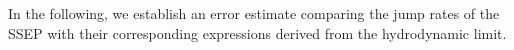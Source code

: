 \documentclass[UTF-8,reqno]{amsart}
\numberwithin{equation}{section}
\newtheorem{lemma}[theorem]{Lemma}
\def\ge{\geqslant}
\def\le{\leqslant}
\def\ge{\geqslant}
\def\le{\leqslant}
\begin{document}
%
%

In the following, we establish an error estimate comparing the jump rates of the SSEP with their corresponding expressions derived from the hydrodynamic limit. 
\end{document}
